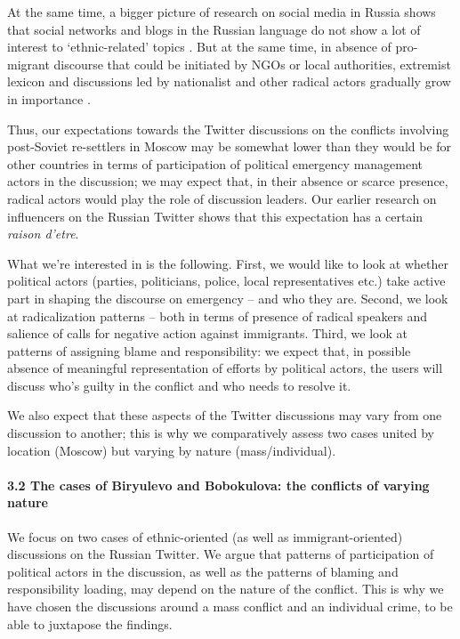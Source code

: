 At the same time, a bigger picture of research on social media in Russia shows that social networks and blogs in the Russian language do not show a lot of interest to ‘ethnic-related’ topics \cite{BodrunovaBlekanovMaksimov,Kapucu}. But at the same time, in absence of pro-migrant discourse that could be initiated by NGOs or local authorities, extremist lexicon and discussions led by nationalist and other radical actors gradually grow in importance \cite{SalimovskyErmakova}.

Thus, our expectations towards the Twitter discussions on the conflicts involving post-Soviet re-settlers in Moscow may be somewhat lower than they would be for other countries in terms of participation of political emergency management actors in the discussion; we may expect that, in their absence or scarce presence, radical actors would play the role of discussion leaders. Our earlier research on influencers on the Russian Twitter \cite{BodrunovaLitvinenkoNigmatullina} shows that this expectation has a certain \textit{raison d’etre}.

What we’re interested in is the following. First, we would like to look at whether political actors (parties, politicians, police, local representatives etc.) take active part in shaping the discourse on emergency -- and who they are. Second, we look at radicalization patterns -- both in terms of presence of radical speakers and salience of calls for negative action against immigrants. Third, we look at patterns of assigning blame and responsibility: we expect that, in possible absence of meaningful representation of efforts by political actors, the users will discuss who’s guilty in the conflict and who needs to resolve it.

We also expect that these aspects of the Twitter discussions may vary from one discussion to another; this is why we comparatively assess two cases united by location (Moscow) but varying by nature (mass/individual).

\paragraph{3.2 The cases of Biryulevo and Bobokulova: the conflicts of varying nature}
We focus on two cases of ethnic-oriented (as well as immigrant-oriented) discussions on the Russian Twitter. We argue that patterns of participation of political actors in the discussion, as well as the patterns of blaming and responsibility loading, may depend on the nature of the conflict. This is why we have chosen the discussions around a mass conflict and an individual crime, to be able to juxtapose the findings.

